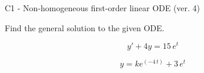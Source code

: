 \begin{exercise}
  \begin{exerciseTitle}C1 - Non-homogeneous first-order linear ODE (ver. 4)\end{exerciseTitle}
  \begin{exerciseStatement}
    
Find the general solution to the given ODE.

    
\[y'+4y= 15 \, e^{t}\]

  \end{exerciseStatement}
  \begin{exerciseAnswer}
    
\[y= k e^{\left(-4 \, t\right)} + 3 \, e^{t}\]

  \end{exerciseAnswer}
\end{exercise}